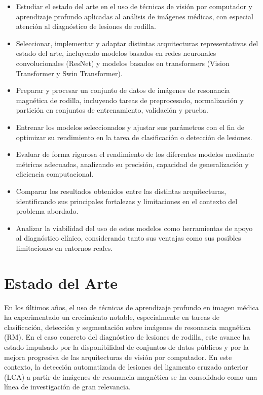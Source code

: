 \begin{itemize}
    \item Estudiar el estado del arte en el uso de técnicas de visión por computador y aprendizaje profundo aplicadas al análisis de imágenes médicas, con especial atención al diagnóstico de lesiones de rodilla.
    
    \item Seleccionar, implementar y adaptar distintas arquitecturas representativas del estado del arte, incluyendo modelos basados en redes neuronales convolucionales (ResNet) y modelos basados en transformers (Vision Transformer y Swin Transformer).
    
    \item Preparar y procesar un conjunto de datos de imágenes de resonancia magnética de rodilla, incluyendo tareas de preprocesado, normalización y partición en conjuntos de entrenamiento, validación y prueba.
    
    \item Entrenar los modelos seleccionados y ajustar sus parámetros con el fin de optimizar su rendimiento en la tarea de clasificación o detección de lesiones.
    
    \item Evaluar de forma rigurosa el rendimiento de los diferentes modelos mediante métricas adecuadas, analizando su precisión, capacidad de generalización y eficiencia computacional.
    
    \item Comparar los resultados obtenidos entre las distintas arquitecturas, identificando sus principales fortalezas y limitaciones en el contexto del problema abordado.
    
    \item Analizar la viabilidad del uso de estos modelos como herramientas de apoyo al diagnóstico clínico, considerando tanto sus ventajas como sus posibles limitaciones en entornos reales.
  
\end{itemize}


\section{Estado del Arte}

En los últimos años, el uso de técnicas de aprendizaje profundo en imagen médica ha experimentado un crecimiento notable, especialmente en tareas de clasificación, detección y segmentación sobre imágenes de resonancia magnética (RM). En el caso concreto del diagnóstico de lesiones de rodilla, este avance ha estado impulsado por la disponibilidad de conjuntos de datos públicos y por la mejora progresiva de las arquitecturas de visión por computador. En este contexto, la detección automatizada de lesiones del ligamento cruzado anterior (LCA) a partir de imágenes de resonancia magnética se ha consolidado como una línea de investigación de gran relevancia.

